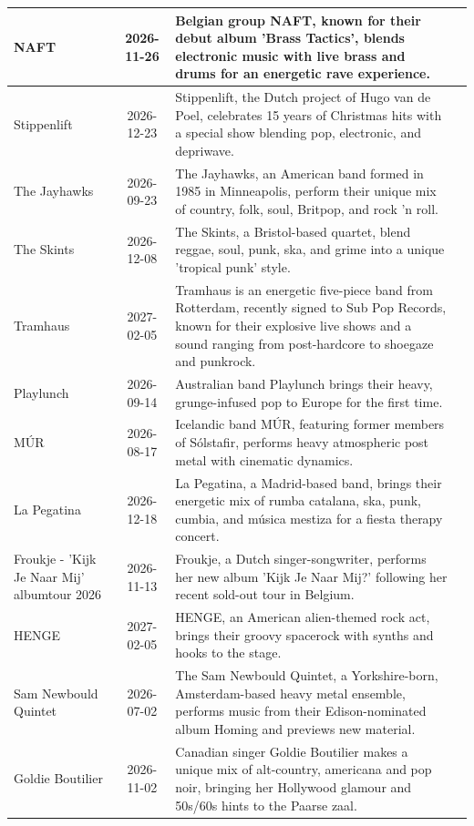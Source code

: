 \begin{center}
\begin{longtable}{p{3cm}cp{7cm}p{3cm}}
\midrule
NAFT & 2026-11-26 & Belgian group NAFT, known for their debut album 'Brass Tactics', blends electronic music with live brass and drums for an energetic rave experience. \\
\midrule
Stippenlift & 2026-12-23 & Stippenlift, the Dutch project of Hugo van de Poel, celebrates 15 years of Christmas hits with a special show blending pop, electronic, and depriwave. \\
\midrule
The Jayhawks & 2026-09-23 & The Jayhawks, an American band formed in 1985 in Minneapolis, perform their unique mix of country, folk, soul, Britpop, and rock 'n roll. \\
\midrule
The Skints & 2026-12-08 & The Skints, a Bristol-based quartet, blend reggae, soul, punk, ska, and grime into a unique 'tropical punk' style. \\
\midrule
Tramhaus & 2027-02-05 & Tramhaus is an energetic five-piece band from Rotterdam, recently signed to Sub Pop Records, known for their explosive live shows and a sound ranging from post-hardcore to shoegaze and punkrock. \\
\midrule
Playlunch & 2026-09-14 & Australian band Playlunch brings their heavy, grunge-infused pop to Europe for the first time. \\
\midrule
MÚR & 2026-08-17 & Icelandic band MÚR, featuring former members of Sólstafir, performs heavy atmospheric post metal with cinematic dynamics. \\
\midrule
La Pegatina & 2026-12-18 & La Pegatina, a Madrid-based band, brings their energetic mix of rumba catalana, ska, punk, cumbia, and música mestiza for a fiesta therapy concert. \\
\midrule
Froukje - 'Kijk Je Naar Mij' albumtour 2026 & 2026-11-13 & Froukje, a Dutch singer-songwriter, performs her new album 'Kijk Je Naar Mij?' following her recent sold-out tour in Belgium. \\
\midrule
HENGE & 2027-02-05 & HENGE, an American alien-themed rock act, brings their groovy spacerock with synths and hooks to the stage. \\
\midrule
Sam Newbould Quintet & 2026-07-02 & The Sam Newbould Quintet, a Yorkshire-born, Amsterdam-based heavy metal ensemble, performs music from their Edison-nominated album Homing and previews new material. \\
\midrule
Goldie Boutilier & 2026-11-02 & Canadian singer Goldie Boutilier makes a unique mix of alt-country, americana and pop noir, bringing her Hollywood glamour and 50s/60s hints to the Paarse zaal. \\

\end{longtable}
\end{center}
